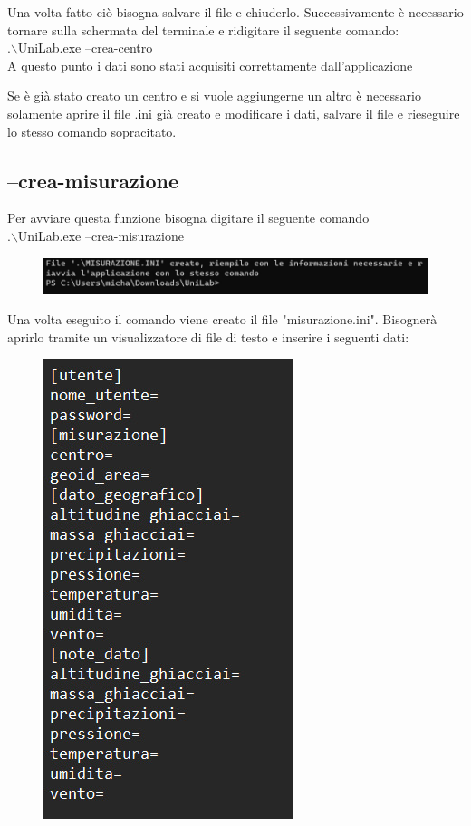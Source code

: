 \documentclass[12pt]{scrreprt}
\begin{document}
		
		Una volta fatto ciò bisogna salvare il file e chiuderlo.
		Successivamente è necessario tornare sulla schermata del terminale e ridigitare il seguente comando:
		\\.$\backslash$UniLab.exe --crea-centro\\
		A questo punto i dati sono stati acquisiti correttamente dall'applicazione
		
		Se è già stato creato un centro e si vuole aggiungerne un altro è necessario solamente aprire il file .ini già creato e modificare i dati, salvare il file e rieseguire lo stesso comando sopracitato.
		
		
		\subsection{--crea-misurazione}
		
		Per avviare questa funzione bisogna digitare il seguente comando
		\\.$\backslash$UniLab.exe --crea-misurazione\\
		\begin{figure}[H]
			\centering
			\includegraphics[width=1\linewidth]{Screen/creamisurazionecom}
			\caption[Schermata principale]{}
			\label{fig:creamisurazionecom}
		\end{figure}
		
		Una volta eseguito il comando viene creato il file "misurazione.ini". Bisognerà aprirlo tramite un visualizzatore di file di testo e inserire i seguenti dati:
		
		\begin{figure}[H]
			\centering
			\includegraphics[width=0.4\linewidth]{Screen/creamisurazioneini}
			\caption{}
			\label{fig:creamisurazioneini}
		\end{figure}
		
\end{document}
